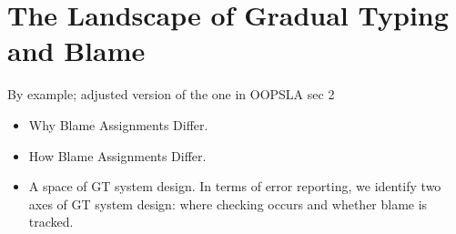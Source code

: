 \section{The Landscape of Gradual Typing and Blame}


   By example; adjusted version of the one in OOPSLA sec 2

  \begin{itemize}

  \item Why Blame Assignments Differ.

  \item How Blame Assignments Differ.

  \item A space of GT system design. In terms of error reporting, we identify two axes of GT system
        design: where checking occurs and whether blame is tracked.
    \end{itemize}



